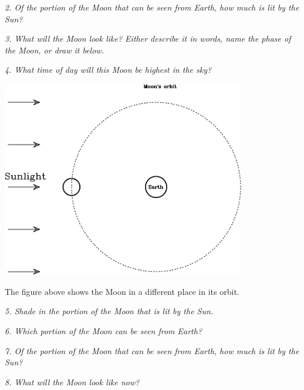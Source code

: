 \documentclass[11pt]{article}
\begin{document}
\vspace{0.8in}

{\it 2. Of the portion of the Moon that can be seen from Earth, how much is lit by the Sun?}

\vspace{0.8in}

{\it 3. What will the Moon look like? Either describe it in words, name the phase of the Moon, or draw it below.}
	
	\vspace{1.2in}
	
{\it 4. What time of day will this Moon be highest in the sky?}
\newpage

\newpage
\includegraphics[width=0.8\textwidth]{moon-diagram-new-crop.pdf}


The figure above shows the Moon in a different place in its orbit.

{\it 5. Shade in the portion of the Moon that is lit by the Sun.}

{\it 6. Which portion of the Moon can be seen from Earth? }

\vspace{0.9in}

{\it 7. Of the portion of the Moon that can be seen from Earth, how much is lit by the Sun?}

\vspace{0.9in}

{\it 8. What will the Moon look like now?}

\vspace{1.8in}

\newpage
\end{document}

